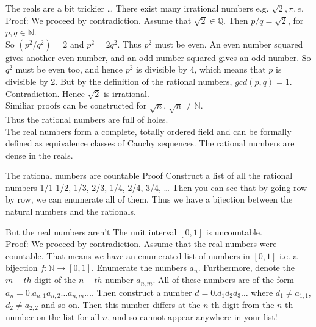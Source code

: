 \documentclass{beamer}
\begin{document}
\begin{frame}{The reals are a bit trickier \ldots}
There exist many irrational numbers e.g. $\sqrt{2}, \pi, e$. \\
Proof:
We proceed by contradiction. Assume that $\sqrt{2} \in \mathbb{Q}$. Then $p / q = \sqrt{2}$, for $p, q \in \mathbb{N}$. \\
So $(p^2 / q^2) = 2$ and $p^2 = 2 q^2$. Thus $p^2$ must be even. An even number squared gives
another even number, and an odd number squared gives an odd number. So $q^2$ must be even too, and
hence $p^2$ is divisible by 4, which means that $p$ is divisible by 2. But by the definition of the 
rational numbers, $gcd(p, q) = 1$. Contradiction. Hence $\sqrt{2}$ is irrational.\\
Similiar proofs can be constructed for $\sqrt{n}$, $\sqrt{n} \ne \mathbb{N}$. \\
Thus the rational numbers are full of holes. \\
The real numbers form a complete, totally ordered field and can be formally defined as equivalence classes of
Cauchy sequences. The rational numbers are dense in the reals.
\end{frame}

\begin{frame}{The rational numbers are countable}
Proof
Construct a list of all the rational numbers
1/1
1/2,
1/3, 2/3,
1/4, 2/4, 3/4,
\ldots
Then you can see that by going row by row, we can enumerate all of them. Thus we have a bijection between the
natural numbers and the rationals.
\end{frame}

\begin{frame}{But the real numbers aren't}
The unit interval $[0, 1]$ is uncountable. \\
Proof:
We proceed by contradiction. Assume that the real numbers were countable. That means we have an enumerated list of numbers in $[0, 1]$ i.e. a bijection $f: \mathbb{N} \to [0, 1]$.
Enumerate the numbers $a_n$. Furthermore, denote the $m-th$ digit of the $n-th$ number $a_{n, m}.$
All of these numbers are of the form $a_n = 0.a_{n, 1} a_{n, 2} \ldots a_{n, m} \ldots$.
Then construct a number $d = 0.d_1 d_2 d_3 \ldots$ where $d_1 \ne a_{1, 1}$, $d_2 \ne a_{2, 2}$ and
so on. Then this number differs at the $n$-th digit from the $n$-th number on  the list for all $n$, and so 
cannot appear anywhere in your list!
\end{frame}
\end{document}
